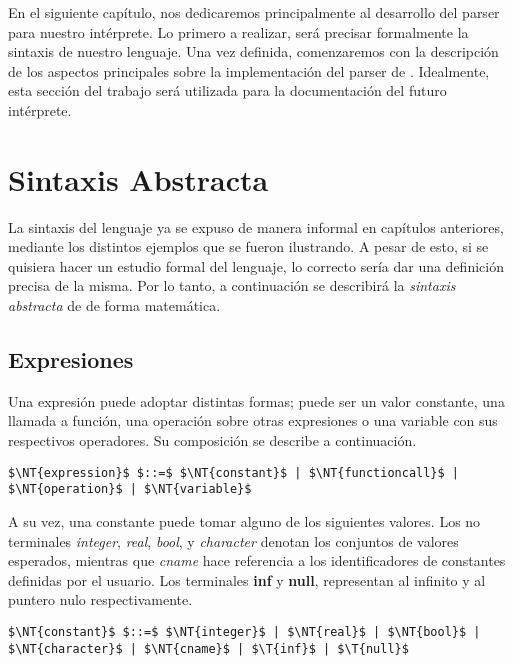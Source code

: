 En el siguiente capítulo, nos dedicaremos principalmente al desarrollo del parser para nuestro intérprete.
Lo primero a realizar, será precisar formalmente la sintaxis de nuestro lenguaje.
Una vez definida, comenzaremos con la descripción de los aspectos principales sobre la implementación del parser de \Lenguaje{}.
Idealmente, esta sección del trabajo será utilizada para la documentación del futuro intérprete.

\section{Sintaxis Abstracta}

La sintaxis del lenguaje ya se expuso de manera informal en capítulos anteriores, mediante los distintos ejemplos que se fueron ilustrando.
A pesar de esto, si se quisiera hacer un estudio formal del lenguaje, lo correcto sería dar una definición precisa de la misma.
Por lo tanto, a continuación se describirá la \textit{sintaxis abstracta} de \Lenguaje{} de forma matemática.

\subsection{Expresiones}

Una expresión puede adoptar distintas formas; puede ser un valor constante, una llamada a función, una operación sobre otras expresiones o una variable con sus respectivos operadores.
Su composición se describe a continuación.

\begin{lstlisting}[style = syntax]
$\NT{expression}$ $::=$ $\NT{constant}$ | $\NT{functioncall}$ | $\NT{operation}$ | $\NT{variable}$
\end{lstlisting}

A su vez, una constante puede tomar alguno de los siguientes valores.
Los no terminales \textit{integer}, \textit{real}, \textit{bool}, y \textit{character} denotan los conjuntos de valores esperados, mientras que \textit{cname} hace referencia a los identificadores de constantes definidas por el usuario.
Los terminales \textbf{inf} y \textbf{null}, representan al infinito y al puntero nulo respectivamente.

\begin{lstlisting}[style = syntax]
$\NT{constant}$ $::=$ $\NT{integer}$ | $\NT{real}$ | $\NT{bool}$ | $\NT{character}$ | $\NT{cname}$ | $\T{inf}$ | $\T{null}$
\end{lstlisting}

